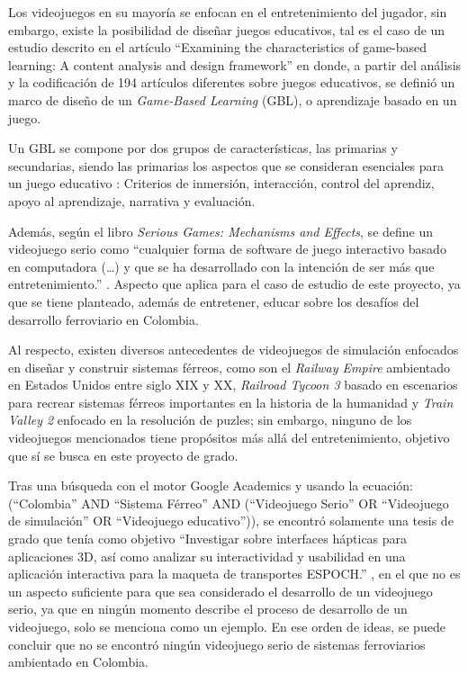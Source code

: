 Los videojuegos en su mayoría se enfocan en el entretenimiento del jugador, sin embargo, existe la posibilidad de diseñar juegos educativos, tal es el caso de un estudio descrito en el artículo “Examining the characteristics of game-based learning: A content analysis and design framework” \autocite{gblFrameworkExamining} en donde, a partir del análisis y la codificación de 194 artículos diferentes sobre juegos educativos, se definió un marco de diseño de un \textit{Game-Based Learning} (GBL), o aprendizaje basado en un juego.

Un GBL se compone por dos grupos de características, las primarias y secundarias, siendo las primarias los aspectos que se consideran esenciales para un juego educativo \autocite{gblFrameworkExamining}: Criterios de inmersión, interacción, control del aprendiz, apoyo al aprendizaje, narrativa y evaluación.

Además, según el libro \textit{Serious Games: Mechanisms and Effects}, se define un videojuego serio como “cualquier forma de software de juego interactivo basado en computadora (…) y que se ha desarrollado con la intención de ser más que entretenimiento.” \autocite[p.~6]{seriousGamesMechanisms}. Aspecto que aplica para el caso de estudio de este proyecto, ya que se tiene planteado, además de entretener, educar sobre los desafíos del desarrollo ferroviario en Colombia.

Al respecto, existen diversos antecedentes de videojuegos de simulación enfocados en diseñar y construir sistemas férreos, como son el \textit{Railway Empire} \autocite{railwayEmpire} ambientado en Estados Unidos entre siglo XIX y XX, \textit{Railroad Tycoon 3} \autocite{railroadTycoon3} basado en escenarios para recrear sistemas férreos importantes en la historia de la humanidad y \textit{Train Valley 2} \autocite{trainValley2} enfocado en la resolución de puzles; sin embargo, ninguno de los videojuegos mencionados tiene propósitos más allá del entretenimiento, objetivo que sí se busca en este proyecto de grado.

Tras una búsqueda con el motor Google Academics y usando la ecuación: (“Colombia” AND “Sistema Férreo” AND (“Videojuego Serio” OR “Videojuego de simulación” OR “Videojuego educativo”)), se encontró solamente una tesis de grado que tenía como objetivo “Investigar sobre interfaces hápticas para aplicaciones 3D, así como analizar su interactividad y usabilidad en una aplicación interactiva para la maqueta de transportes ESPOCH.” \autocite{tesisInterfacesHapticas}, en el que no es un aspecto suficiente para que sea considerado el desarrollo de un videojuego serio, ya que en ningún momento describe el proceso de desarrollo de un videojuego, solo se menciona como un ejemplo. En ese orden de ideas, se puede concluir que no se encontró ningún videojuego serio de sistemas ferroviarios ambientado en Colombia.

